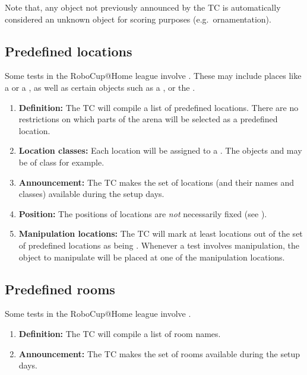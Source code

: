 Note that, any object not previously announced by the TC is automatically considered an unknown object for scoring purposes (e.g.~ornamentation).

%
%

\subsection{Predefined locations}
\label{rule:scenario_locations}

Some tests in the RoboCup@Home league involve . 
These may include places like a  or a , as well as certain objects such as a , or the . 

\begin{enumerate}
	\item \textbf{Definition:} The TC will compile a list of predefined locations. There are no restrictions on which parts of the arena will be selected as a predefined location.

	\item \textbf{Location classes:} Each location will be assigned to a . The objects  and  may be of class  for example. 

	\item \textbf{Announcement:} The TC makes the set of locations (and their names and classes) available during the setup days.

	\item \textbf{Position:} The positions of locations are \emph{not} necessarily fixed (see ).

	\item \textbf{Manipulation locations:} The TC will mark at least \NumLocations locations out of the set of predefined locations as being . Whenever a test involves manipulation, the object to manipulate will be placed at one of the manipulation locations. 
\end{enumerate}



\subsection{Predefined rooms}
\label{rule:scenario_rooms}
Some tests in the RoboCup@Home league involve . 
\begin{enumerate}
	\item \textbf{Definition:} The TC will compile a list of room names.
	\item \textbf{Announcement:} The TC makes the set of rooms available during the setup days.
\end{enumerate}



